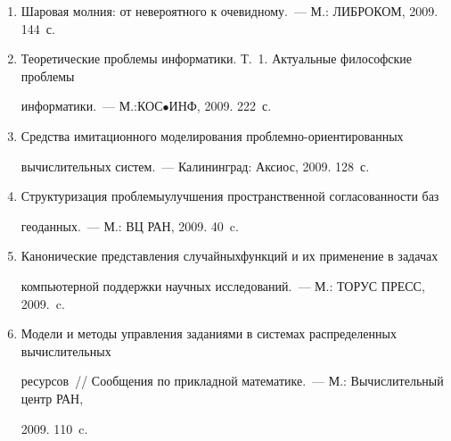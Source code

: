 \begin{enumerate}[1.]


\item {}


Шаровая молния: от невероятного к очевидному.~--- М.: ЛИБРОКОМ, 2009. 144~с.





\item {}


Теоретические проблемы информатики. Т.~1. Актуальные философские проблемы 


информатики.~--- М.:\linebreak КОС$\bullet$ИНФ, 2009. 222~с.














\item 




Средства имитационного моделирования проб\-лем\-но-ори\-ен\-ти\-ро\-ван\-ных 


вычислительных систем.~--- Калининград: Аксиос, 2009. 128~с.





\item




Структуризация проблемы\linebreak улучшения пространственной согласованности баз 


геоданных.~--- М.: ВЦ РАН, 2009.  40~c. 





\item




Канонические представления случайных\linebreak функций и их применение в задачах 


компьютерной под\-держ\-ки научных исследований.~--- М.: ТОРУС ПРЕСС, 2009.~c.





\item {}


Модели и методы управления заданиями в системах распределенных вычислительных 


ресурсов~// Сообщения по прикладной математике.~--- М.: Вычислительный центр РАН, 


2009. 110~c.


\end{enumerate}
